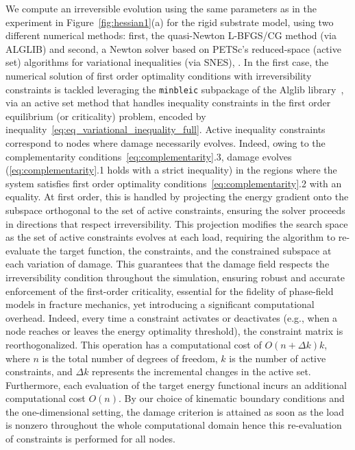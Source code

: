     {
        We compute an irreversible evolution using the same parameters as in the experiment in Figure~\ref{fig:hessian1}(a) for the rigid substrate model,
        using two different numerical methods: first, the quasi-Newton L-BFGS/CG method (via ALGLIB) and second, a Newton solver based on PETSc's reduced-space (active set) algorithms for variational inequalities (via SNES), \cite{petsc-user-ref, petsc-efficient}.
        In the first case, the numerical solution of first order optimality conditions with irreversibility constraints is tackled leveraging the \texttt{minbleic} subpackage of the Alglib library~\cite{Bochkanov2013-lk}, via an active set method that handles inequality constraints in the first order equilibrium (or criticality) problem, encoded by inequality~\eqref{eq:eq_variational_inequality_full}.
        Active inequality constraints correspond to nodes where damage necessarily evolves. Indeed, owing to the complementarity conditions~\eqref{eq:complementarity}.3, damage evolves (\eqref{eq:complementarity}.1 holds with a strict inequality) in the regions where the system satisfies first order optimality conditions~\eqref{eq:complementarity}.2 with an equality.
        At first order, this is handled by projecting the energy gradient onto the subspace orthogonal to the set of active constraints, ensuring the solver proceeds in directions that respect irreversibility.
        This projection modifies the search space as the set of active constraints evolves at each load, requiring the algorithm to re-evaluate the target function, the constraints, and the constrained subspace at each variation of damage.
        This guarantees that the damage field respects the irreversibility condition throughout the simulation, ensuring robust and accurate enforcement of the first-order criticality, essential for the fidelity of phase-field models in fracture mechanics, yet introducing a significant computational overhead.
        Indeed, every time a constraint activates or deactivates (e.g., when a node reaches or leaves the energy optimality threshold), the constraint matrix is reorthogonalized.
        This operation has a computational cost of $O(n+\Delta k)k$, where $n$ is the total number of degrees of freedom, $k$ is the number of active constraints, and $\Delta k$ represents the incremental changes in the active set.
        Furthermore, each evaluation of the target energy functional incurs an additional computational cost $O(n)$.
        By our choice of kinematic boundary conditions
        and the one-dimensional setting, the damage criterion is attained as soon as the load is nonzero throughout the whole computational domain hence this re-evaluation of constraints is performed for all nodes.
    }

